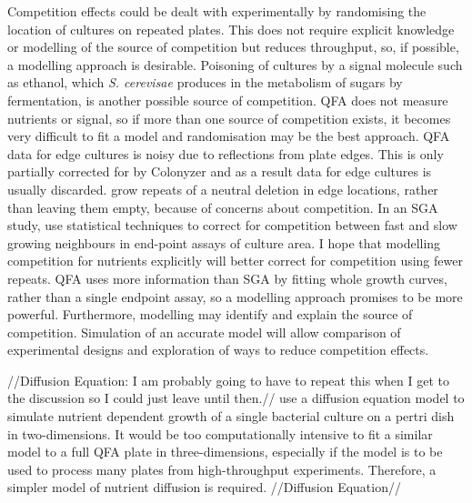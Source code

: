 Competition effects could be dealt with experimentally by randomising
the location of cultures on repeated plates. This does not require
explicit knowledge or modelling of the source of competition but
reduces throughput, so, if possible, a modelling approach is
desirable. Poisoning of cultures by a signal molecule such as ethanol,
which \textit{S. cerevisae} produces in the metabolism of sugars by
fermentation, is another possible source of competition. QFA does not
measure nutrients or signal, so if more than one source of competition
exists, it becomes very difficult to fit a model and randomisation may
be the best approach. QFA data for edge cultures is noisy due to
reflections from plate edges. This is only partially corrected for by
Colonyzer \citep{Lawless2010} and as a result data for edge cultures
is usually discarded. \citet{Addinall2011} grow repeats of a neutral
deletion in edge locations, rather than leaving them empty, because of
concerns about competition. In an SGA study, \citet{Baryshnikova2010}
use statistical techniques to correct for competition between fast and
slow growing neighbours in end-point assays of culture area. I hope
that modelling competition for nutrients explicitly will better
correct for competition using fewer repeats. QFA uses more information
than SGA by fitting whole growth curves, rather than a single endpoint
assay, so a modelling approach promises to be more
powerful. Furthermore, modelling may identify and explain the source
of competition. Simulation of an accurate model will allow comparison
of experimental designs and exploration of ways to reduce competition
effects.

//Diffusion Equation: I am probably going to have to repeat this
when I get to the discussion so I could just leave until then.//
\citet{Reo2014} use a diffusion equation model to simulate nutrient
dependent growth of a single bacterial culture on a pertri dish in
two-dimensions. It would be too computationally intensive to fit a
similar model to a full QFA plate in three-dimensions, especially if
the model is to be used to process many plates from high-throughput
experiments. Therefore, a simpler model of nutrient diffusion is
required. //Diffusion Equation//


